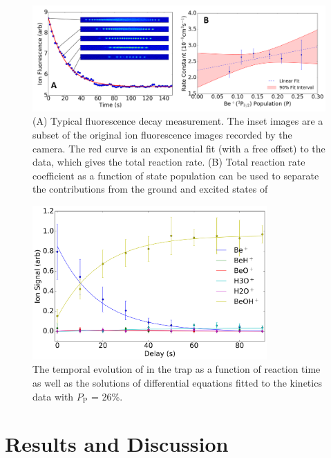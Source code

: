 \begin{figure}
	\centering
	\includegraphics[width=\textwidth]{images/Be_H2O_fit.png}
	\caption{(A) Typical fluorescence decay measurement. The inset images are a subset of the original ion fluorescence images recorded by the camera. The red curve is an exponential fit (with a free offset) to the data, which gives the total reaction rate. (B) Total reaction rate coefficient as a function of  state population can be used to separate the contributions from the ground and excited states of }
	\label{fig: Be+H2O fit}
\end{figure}

\begin{figure}
	\centering
	\includegraphics[width=0.8\textwidth]{images/Be_H2O_sf.png}
	\caption{The temporal evolution of 	in the trap as a function of reaction time as well as the solutions of differential equations fitted to the kinetics data with $P_{\text{P}}$ = 26\%.}
	\label{fig: Be+H2O shared fit}
\end{figure}


\section{Results and Discussion}

